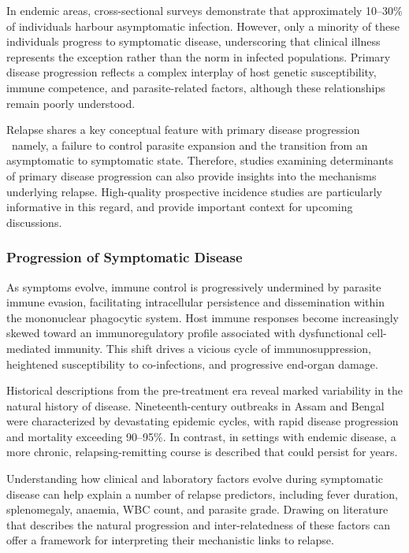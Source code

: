 In endemic areas, cross-sectional surveys demonstrate that approximately 10--30\% of individuals harbour asymptomatic infection\cite{mannan2021}. However, only a minority of these individuals progress to symptomatic disease, underscoring that clinical illness represents the exception rather than the norm in infected populations\cite{hasker2014}. Primary disease progression reflects a complex interplay of host genetic susceptibility, immune competence, and parasite-related factors, although these relationships remain poorly understood\cite{kaye2011}.

Relapse shares a key conceptual feature with primary disease progression \textemdash\ namely, a failure to control parasite expansion and the transition from an asymptomatic to symptomatic state. Therefore, studies examining determinants of primary disease progression can also provide insights into the mechanisms underlying relapse. High-quality prospective incidence studies are particularly informative in this regard, and provide important context for upcoming discussions\cite{picado2010,hasker2014,bern2007}.

\subsubsection{Progression of Symptomatic Disease}

As symptoms evolve, immune control is progressively undermined by parasite immune evasion, facilitating intracellular persistence and dissemination within the mononuclear phagocytic system. Host immune responses become increasingly skewed toward an immunoregulatory profile associated with dysfunctional cell-mediated immunity. This shift drives a vicious cycle of immunosuppression, heightened susceptibility to co-infections, and progressive end-organ damage\cite{kaye2011,costa2023}.

Historical descriptions from the pre-treatment era reveal marked variability in the natural history of disease. Nineteenth-century outbreaks in Assam and Bengal were characterized by devastating epidemic cycles, with rapid disease progression and mortality exceeding 90--95\%\cite{sengupta1947,gibson1983}. In contrast, in settings with endemic disease, a more chronic, relapsing-remitting course is described that could persist for years\cite{sengupta1947}.

Understanding how clinical and laboratory factors evolve during symptomatic disease can help explain a number of relapse predictors, including fever duration, splenomegaly, anaemia, WBC count, and parasite grade. Drawing on literature that describes the natural progression and inter-relatedness of these factors can offer a framework for interpreting their mechanistic links to relapse.

